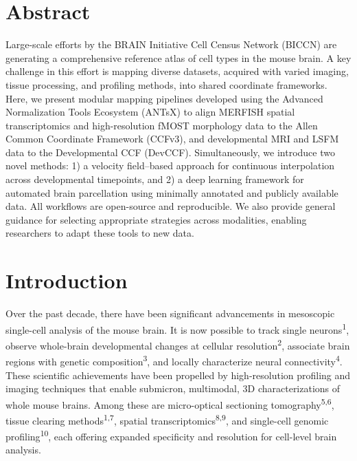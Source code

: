 \documentclass[
  12pt,
]{article}
\begin{document}
\normalsize

\newpage


\section*{Abstract}\label{abstract}

Large-scale efforts by the BRAIN Initiative Cell Census Network (BICCN)
are generating a comprehensive reference atlas of cell types in the
mouse brain. A key challenge in this effort is mapping diverse datasets,
acquired with varied imaging, tissue processing, and profiling methods,
into shared coordinate frameworks. Here, we present modular mapping
pipelines developed using the Advanced Normalization Tools Ecosystem
(ANTsX) to align MERFISH spatial transcriptomics and high-resolution
fMOST morphology data to the Allen Common Coordinate Framework (CCFv3),
and developmental MRI and LSFM data to the Developmental CCF (DevCCF).
Simultaneously, we introduce two novel methods: 1) a velocity
field--based approach for continuous interpolation across developmental
timepoints, and 2) a deep learning framework for automated brain
parcellation using minimally annotated and publicly available data. All
workflows are open-source and reproducible. We also provide general
guidance for selecting appropriate strategies across modalities,
enabling researchers to adapt these tools to new data.

\clearpage

\section{Introduction}\label{introduction}

Over the past decade, there have been significant advancements in
mesoscopic single-cell analysis of the mouse brain. It is now possible
to track single neurons\textsuperscript{1}, observe whole-brain
developmental changes at cellular resolution\textsuperscript{2},
associate brain regions with genetic composition\textsuperscript{3}, and
locally characterize neural connectivity\textsuperscript{4}. These
scientific achievements have been propelled by high-resolution profiling
and imaging techniques that enable submicron, multimodal, 3D
characterizations of whole mouse brains. Among these are micro-optical
sectioning tomography\textsuperscript{5,6}, tissue clearing
methods\textsuperscript{1,7}, spatial
transcriptomics\textsuperscript{8,9}, and single-cell genomic
profiling\textsuperscript{10}, each offering expanded specificity and
resolution for cell-level brain analysis.
\end{document}
